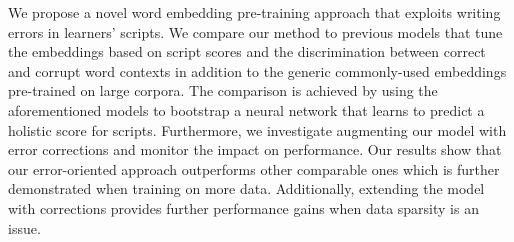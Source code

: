 We propose a novel word embedding pre-training approach that exploits writing errors in learners' scripts. We compare our method to previous models that tune the embeddings based on script scores and the discrimination between correct and corrupt word contexts in addition to the generic commonly-used embeddings pre-trained on large corpora. The comparison is achieved by using the aforementioned models to bootstrap a neural network that learns to predict a holistic score for scripts. Furthermore, we investigate augmenting our model with error corrections and monitor the impact on performance. Our results show that our error-oriented approach outperforms other comparable ones which is further demonstrated when training on more data. Additionally, extending the model with corrections provides further performance gains when data sparsity is an issue.

